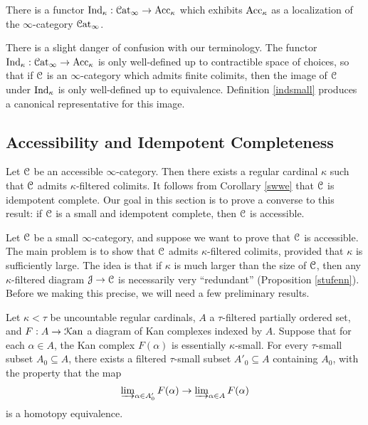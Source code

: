 \begin{proposition}\label{lockap}
There is a functor $\operatorname{Ind}_{\kappa}: \operatorname{\mathcal{C}at}_{\infty} \rightarrow \operatorname{Acc}_{\kappa}$ which exhibits
$\operatorname{Acc}_{\kappa}$ as a localization of the $\infty$-category $\operatorname{\mathcal{C}at}_{\infty}$.
\end{proposition}

\begin{remark}
There is a slight danger of confusion with our terminology. The functor $\operatorname{Ind}_{\kappa}: \operatorname{\mathcal{C}at}_{\infty} \rightarrow \operatorname{Acc}_{\kappa}$ is only well-defined up to contractible space of choices, so that
if $\operatorname{\mathcal{C}}$ is an $\infty$-category which admits finite colimits, then the image of $\operatorname{\mathcal{C}}$ under $\operatorname{Ind}_{\kappa}$ is only well-defined up to equivalence. Definition \ref{indsmall} produces a canonical representative for this image.
\end{remark}

\subsection{Accessibility and Idempotent Completeness}\label{accessidem}

Let $\operatorname{\mathcal{C}}$ be an accessible $\infty$-category. Then there exists a regular cardinal
$\kappa$ such that $\operatorname{\mathcal{C}}$ admits $\kappa$-filtered colimits. It follows from Corollary \ref{swwe} that $\operatorname{\mathcal{C}}$ is idempotent complete. Our goal in this section is to prove a converse to this result: if $\operatorname{\mathcal{C}}$ is a small and idempotent complete, then $\operatorname{\mathcal{C}}$ is accessible. 

Let $\operatorname{\mathcal{C}}$ be a small $\infty$-category, and suppose we want to prove that $\operatorname{\mathcal{C}}$ is accessible. 
The main problem is to show that $\operatorname{\mathcal{C}}$ admits $\kappa$-filtered colimits, provided that $\kappa$ is sufficiently large. The idea is that if $\kappa$ is much larger than the size of $\operatorname{\mathcal{C}}$, then any $\kappa$-filtered diagram $\operatorname{\mathcal{J}} \rightarrow \operatorname{\mathcal{C}}$ is necessarily very ``redundant'' (Proposition \ref{stufenn}). Before we making this precise, we will need a few preliminary results.

\begin{lemma}\label{techycard}
Let $\kappa < \tau$ be uncountable regular cardinals, $A$ a $\tau$-filtered partially ordered set, and $F: A \rightarrow \operatorname{\mathcal{K}an}$ a diagram of Kan complexes indexed by $A$. Suppose that for each $\alpha \in A$, the Kan complex $F(\alpha)$ is essentially $\kappa$-small.
For every $\tau$-small subset $A_0 \subseteq A$, there exists a filtered
$\tau$-small subset $A'_0 \subseteq A$ containing $A_0$, with the property that the map
$$ \operatorname{\varinjlim}_{\alpha \in A'_0} F(\alpha) \rightarrow \operatorname{\varinjlim}_{\alpha \in A} F(\alpha)$$ is a homotopy equivalence.
\end{lemma}

